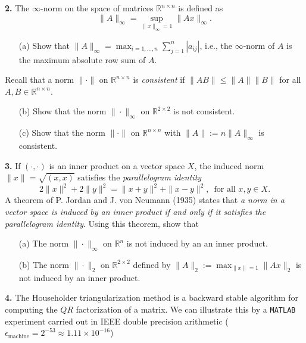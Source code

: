 \documentclass[10pt]{report}
\begin{document}
\item[\textbf{2.}] The $\infty$-norm on the space of matrices $\mathbb{R}^{n \times n}$ is defined as
\[\|A\|_{\infty}= \sup_{\|x\|_{\infty}=1} \|Ax\|_{\infty}.\]
\begin{enumerate} 
\item[(a)] Show that $\|A\|_{\infty}= \displaystyle{\max_{i=1, \ldots, n}}\sum_{j=1}^n |a_{ij}|$, i.e., the $\infty$-norm of $A$ is the maximum absolute row sum of $A$.
\end{enumerate}
Recall that a norm $\|\cdot\|$ on $\mathbb{R}^{n \times n}$ is \textit{consistent} if $\|AB\| \leq \|A\| \|B\|$ for all $A, B \in \mathbb{R}^{n \times n}$. 
\begin{enumerate} 
\item[(b)]Show that the norm $\|\cdot\|_\infty$ on $\mathbb{R}^{2 \times 2}$ is not consistent.
\item[(c)] Show that the norm $\| \cdot\|$ on $\mathbb{R}^{n \times n}$ with $\|A\|:=n \|A\|_\infty$ is consistent.
\end{enumerate}
\vspace{0.4cm} 
\item[\textbf{3.}] If $(\cdot,\cdot)$ is an inner product on a vector  space $X$, the induced norm $\|x\|= \sqrt{(x, x)}$ satisfies the \textit{parallelogram identity}
\[2 \|x\|^2 + 2\|y\|^2 = \|x+y\|^2 + \|x-y\|^2, \, \text{ for all } x,y \in X.\]
A theorem of P. Jordan and J. von Neumann (1935) states that \textit{a norm in a vector space is induced by an inner product if and only if it satisfies the parallelogram identity}. Using this theorem, show that
\begin{enumerate}
  \item[(a)] The norm $\|\cdot\|_{\infty}$ on $\mathbb{R}^n$ is not induced by an an inner product.
  \item[(b)] The norm $\|\cdot\|_{2}$ on $\mathbb{R}^{2\times 2}$ defined by $\|A\|_2:= \max_{\|x\|=1}\|Ax\|_2$ is not induced by an inner product.
\end{enumerate}









\item[\textbf{4.}] The Householder triangularization method is a backward stable algorithm
  for computing the $QR$ factorization of a matrix. We can illustrate this by a \verb+MATLAB+
  experiment carried out in IEEE double precision arithmetic
  ($\epsilon_{\text{machine}}=2^{-53}\approx 1.11\times10^{-16}$)
\end{document}

